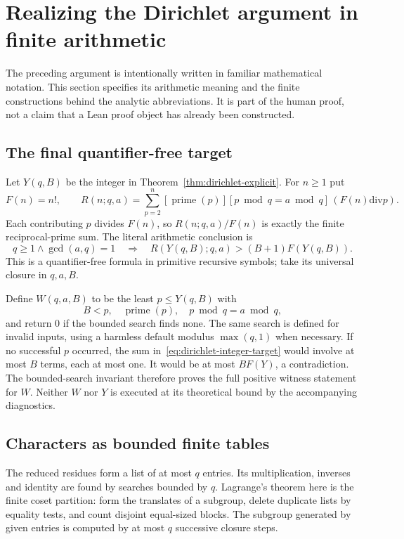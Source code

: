 \section{Realizing the Dirichlet argument in finite arithmetic}
\label{sec:dirichlet-arithmetic}

The preceding argument is intentionally written in familiar mathematical notation. This section specifies its arithmetic meaning and the finite constructions behind the analytic abbreviations. It is part of the human proof, not a claim that a Lean proof object has already been constructed.

\subsection{The final quantifier-free target}

Let $Y(q,B)$ be the integer in Theorem~\ref{thm:dirichlet-explicit}. For $n\geq1$ put
\[
 F(n)=n!,\qquad
 R(n;q,a)=\sum_{p=2}^{n}
 [\operatorname{prime}(p)] [p\bmod q=a\bmod q]\,(F(n)\mathbin{\mathrm{div}}p).
\]
Each contributing $p$ divides $F(n)$, so $R(n;q,a)/F(n)$ is exactly the finite reciprocal-prime sum. The literal arithmetic conclusion is
\begin{equation}
 q\geq1\land\gcd(a,q)=1
 \quad\Longrightarrow\quad
 R(Y(q,B);q,a)>(B+1)F(Y(q,B)).
 \label{eq:dirichlet-integer-target}
\end{equation}
This is a quantifier-free formula in primitive recursive symbols; take its universal closure in $q,a,B$.

Define $W(q,a,B)$ to be the least $p\leq Y(q,B)$ with
\[
 B<p,\quad \operatorname{prime}(p),\quad p\bmod q=a\bmod q,
\]
and return $0$ if the bounded search finds none. The same search is defined for invalid inputs, using a harmless default modulus $\max(q,1)$ when necessary. If no successful $p$ occurred, the sum in~\eqref{eq:dirichlet-integer-target} would involve at most $B$ terms, each at most one. It would be at most $BF(Y)$, a contradiction. The bounded-search invariant therefore proves the full positive witness statement for $W$. Neither $W$ nor $Y$ is executed at its theoretical bound by the accompanying diagnostics.

\subsection{Characters as bounded finite tables}

The reduced residues form a list of at most $q$ entries. Its multiplication, inverses and identity are found by searches bounded by $q$. Lagrange's theorem here is the finite coset partition: form the translates of a subgroup, delete duplicate lists by equality tests, and count disjoint equal-sized blocks. The subgroup generated by given entries is computed by at most $q$ successive closure steps.

